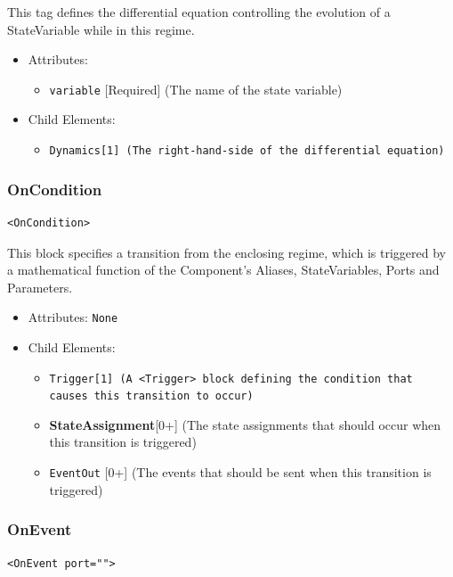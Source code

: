 \documentclass{article}
\newcommand{\MathInline}{\tt{Dynamics}}
\newcommand{\StateAssignment}{{\bf{StateAssignment}}\xspace}
\newcommand{\Trigger}{\tt{Trigger}}
\begin{document}
This tag defines the differential equation controlling the evolution of a
StateVariable while
in this regime.

\begin{itemize}
\item Attributes:
%
\begin{itemize}
\item \verb|variable| {[}Required{]} (The name of the state variable)
\end{itemize}

\item Child Elements:
%
\begin{itemize}
\item \MathInline {[}1{]} (The right-hand-side of the differential equation)
\end{itemize}
\end{itemize}

\subsubsection{OnCondition}
%
\begin{lstlisting}
<OnCondition>
\end{lstlisting}

This block specifies a transition from the enclosing regime, which is triggered
by a mathematical function of the Component's Aliases, StateVariables, Ports and
Parameters.

\begin{itemize}
\item Attributes: \texttt{None}

\item Child Elements:
%
\begin{itemize}
\item \Trigger {[}1{]} (A \verb|<Trigger>| block defining the condition that
causes this transition to occur)
\item \StateAssignment {[}0+{]} (The state assignments that should occur when
this transition is triggered)
\item {\tt EventOut} {[}0+{]} (The events that should be sent when this
transition is triggered)
\end{itemize}
\end{itemize}

\subsubsection{OnEvent}
%
\begin{lstlisting}
<OnEvent port="">
\end{lstlisting}
\end{document}
